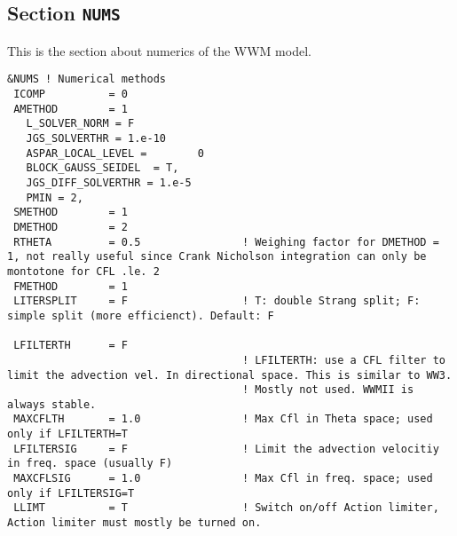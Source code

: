 \documentclass[12pt]{amsart}
\begin{document}
\subsection{Section {\tt NUMS}}
This is the section about numerics of the WWM model.

\begin{verbatim}
&NUMS ! Numerical methods
 ICOMP          = 0
 AMETHOD        = 1
   L_SOLVER_NORM = F   
   JGS_SOLVERTHR = 1.e-10
   ASPAR_LOCAL_LEVEL =        0
   BLOCK_GAUSS_SEIDEL  = T,
   JGS_DIFF_SOLVERTHR = 1.e-5
   PMIN = 2,
 SMETHOD        = 1
 DMETHOD        = 2
 RTHETA         = 0.5                ! Weighing factor for DMETHOD = 1, not really useful since Crank Nicholson integration can only be montotone for CFL .le. 2
 FMETHOD        = 1
 LITERSPLIT     = F                  ! T: double Strang split; F: simple split (more efficienct). Default: F

 LFILTERTH      = F
                                     ! LFILTERTH: use a CFL filter to limit the advection vel. In directional space. This is similar to WW3.
                                     ! Mostly not used. WWMII is always stable.
 MAXCFLTH       = 1.0                ! Max Cfl in Theta space; used only if LFILTERTH=T
 LFILTERSIG     = F                  ! Limit the advection velocitiy in freq. space (usually F)
 MAXCFLSIG      = 1.0                ! Max Cfl in freq. space; used only if LFILTERSIG=T
 LLIMT          = T                  ! Switch on/off Action limiter, Action limiter must mostly be turned on.


\end{verbatim}
\end{document}

